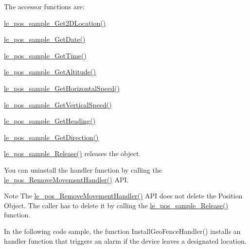 The accessor functions are\+:
\begin{DoxyItemize}
\item \hyperlink{le__pos__interface_8h_ae7b3b16601465b663b468f12c63ea485}{le\+\_\+pos\+\_\+sample\+\_\+\+Get2\+D\+Location()}
\item \hyperlink{le__pos__interface_8h_a8249f20e9d5020aaa23e54ccf6bbeb9d}{le\+\_\+pos\+\_\+sample\+\_\+\+Get\+Date()}
\item \hyperlink{le__pos__interface_8h_a47171bf14bf4f249d3b76a8ed204f13c}{le\+\_\+pos\+\_\+sample\+\_\+\+Get\+Time()}
\item \hyperlink{le__pos__interface_8h_ac6c6868fdc51ce14492adfcd0d7274c0}{le\+\_\+pos\+\_\+sample\+\_\+\+Get\+Altitude()}
\item \hyperlink{le__pos__interface_8h_a0bb7a30675f1dd7891b22c7753d7caec}{le\+\_\+pos\+\_\+sample\+\_\+\+Get\+Horizontal\+Speed()}
\item \hyperlink{le__pos__interface_8h_a18162e15ad9a61696312745ec0bec1fd}{le\+\_\+pos\+\_\+sample\+\_\+\+Get\+Vertical\+Speed()}
\item \hyperlink{le__pos__interface_8h_a181f453d46f8b5440d91f2af1b4ebbfb}{le\+\_\+pos\+\_\+sample\+\_\+\+Get\+Heading()}
\item \hyperlink{le__pos__interface_8h_ae42d09bb5146b52dd1f628a93611bc31}{le\+\_\+pos\+\_\+sample\+\_\+\+Get\+Direction()}
\end{DoxyItemize}

{\ttfamily \hyperlink{le__pos__interface_8h_af2999e2e4f7eca899b2af1125547e3ea}{le\+\_\+pos\+\_\+sample\+\_\+\+Release()}} releases the object.

You can uninstall the handler function by calling the \hyperlink{le__pos__interface_8h_a3c1b616489fc29fc578e58c6b570f14b}{le\+\_\+pos\+\_\+\+Remove\+Movement\+Handler()} A\+P\+I. \begin{DoxyNote}{Note}
The \hyperlink{le__pos__interface_8h_a3c1b616489fc29fc578e58c6b570f14b}{le\+\_\+pos\+\_\+\+Remove\+Movement\+Handler()} A\+P\+I does not delete the Position Object. The caller has to delete it by calling the \hyperlink{le__pos__interface_8h_af2999e2e4f7eca899b2af1125547e3ea}{le\+\_\+pos\+\_\+sample\+\_\+\+Release()} function.
\end{DoxyNote}
In the following code sample, the function Install\+Geo\+Fence\+Handler() installs an handler function that triggers an alarm if the device leaves a designated location.


